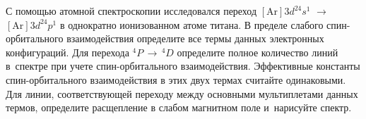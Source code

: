 \par
{} С помощью атомной спектроскопии исследовался переход $[\text{Ar}]3d^24s^1$ $\rightarrow$ $[\text{Ar}]3d^24p^1$ в однократно ионизованном атоме титана. В пределе слабого спин-орбитального взаимодействия определите все термы данных электронных конфигураций. Для перехода $^4P \,\rightarrow\,^4D$ определите полное количество линий в~спектре при учете спин-орбитального взаимодействия. Эффективные константы спин-орбитального взаимодействия в этих двух термах считайте одинаковыми. Для линии, соответствующей переходу между основными мультиплетами данных термов, определите расщепление в слабом магнитном поле и~нарисуйте спектр.
\par